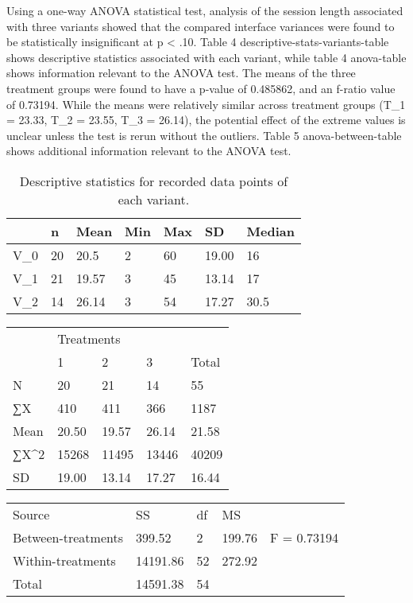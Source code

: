 Using a one-way ANOVA statistical test, analysis of the session length associated with three variants showed that the compared interface variances were found to be statistically insignificant at p < .10. Table 4 {descriptive-stats-variants-table} shows descriptive statistics associated with each variant, while table 4 {anova-table} shows information relevant to the ANOVA test. The means of the three treatment groups were found to have a p-value of 0.485862, and an f-ratio value of 0.73194. While the means were relatively similar across treatment groups (T_1 = 23.33, T_2 = 23.55, T_3 = 26.14), the potential effect of the extreme values is unclear unless the test is rerun without the outliers. Table 5 {anova-between-table} shows additional information relevant to the ANOVA test.


\begin{table}[]
\caption{Descriptive statistics for recorded data points of each variant.}
\label{tab:my-table}
\begin{tabular}{@{}lllllll@{}}
\toprule
     & n  & Mean  & Min & Max & SD    & Median \\ \midrule
V_0 & 20 & 20.5 & 2   & 60  & 19.00 & 16     \\
V_1 & 21 & 19.57 & 3   & 45 & 13.14 & 17   \\
V_2 & 14 & 26.14 & 3   & 54  & 17.27 & 30.5   \\ \bottomrule
\end{tabular}
\end{table}


\begin{table}[]
\begin{tabular}{@{}lllll@{}}
                      & \multicolumn{3}{l}{Treatments} &       \\
                      & 1        & 2        & 3        & Total \\
N                     & 20       & 21       & 14       & 55    \\
∑X                    & 410      & 411      & 366      & 1187  \\
Mean                  & 20.50    & 19.57    & 26.14    & 21.58 \\
∑X\textasciicircum{}2 & 15268    & 11495    & 13446    & 40209 \\
SD                    & 19.00    & 13.14    & 17.27    & 16.44
\end{tabular}
\end{table}


\begin{table}[]
\begin{tabular}{@{}lllll@{}}
Source             & SS       & df & MS     &             \\
Between-treatments & 399.52    & 2  & 199.76  & F = 0.73194 \\
Within-treatments  & 14191.86 & 52 & 272.92 &             \\
Total              & 14591.38 & 54 &        &            
\end{tabular}
\end{table}

